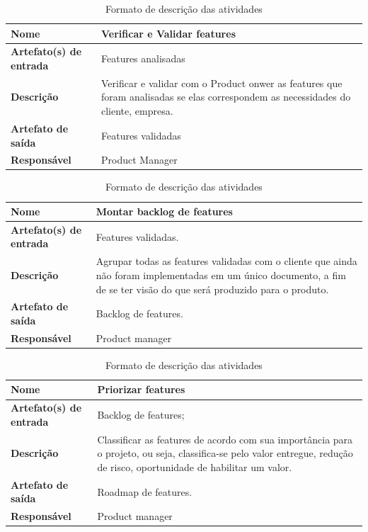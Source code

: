 \begin{table}[h]
    \centering
    \label{descricaoAtividades}
    \caption{Formato de descrição das atividades}
        \begin{tabular}{|l|p{10cm}|}
        \hline
        \textbf{Nome} & Verificar e Validar features \\
        \hline
        \textbf{Artefato(s) de entrada} & Features analisadas \\
        \hline
        \textbf{Descrição} & Verificar e validar com o Product onwer as features que foram analisadas se elas correspondem as necessidades do cliente, empresa. \\
        \hline
        \textbf{Artefato de saída} & Features validadas \\
        \hline
        \textbf{Responsável} & Product Manager \\
        \hline
    \end{tabular}
\end{table}

\begin{table}[h]
    \centering
    \label{descricaoAtividades}
    \caption{Formato de descrição das atividades}
        \begin{tabular}{|l|p{10cm}|}
        \hline
        \textbf{Nome} & Montar backlog de features \\
        \hline
        \textbf{Artefato(s) de entrada} & Features validadas. \\
        \hline
        \textbf{Descrição} & Agrupar todas as features validadas com o cliente que ainda não foram implementadas em um único documento, a fim de se ter visão do que será produzido para o produto. \\
        \hline
        \textbf{Artefato de saída} & Backlog de features. \\
        \hline
        \textbf{Responsável} & Product manager \\
        \hline
    \end{tabular}
\end{table}

\begin{table}[h]
    \centering
    \label{descricaoAtividades}
    \caption{Formato de descrição das atividades}
        \begin{tabular}{|l|p{10cm}|}
        \hline
        \textbf{Nome} & Priorizar features \\
        \hline
        \textbf{Artefato(s) de entrada} & Backlog de features; \\
        \hline
        \textbf{Descrição} & Classificar as features de acordo com sua importância para o projeto, ou seja, classifica-se pelo valor entregue, redução de risco, oportunidade de habilitar um valor. \\
        \hline
        \textbf{Artefato de saída} & Roadmap de features. \\
        \hline
        \textbf{Responsável} & Product manager \\
        \hline
    \end{tabular}
\end{table}

